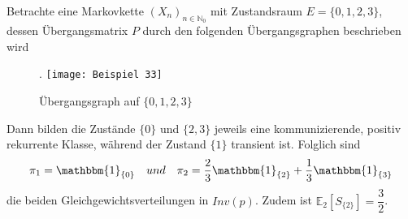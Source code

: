 Betrachte eine Markovkette $(X_{n})_{n \in \mathbb{N}_{0}}$ mit Zustandsraum $E = \lbrace 0,1,2,3 \rbrace$, dessen Übergangsmatrix $P$ durch den folgenden Übergangsgraphen beschrieben wird
\begin{figure}[H].
\centering
\texttt{[image: Beispiel 33]}
\caption{Übergangsgraph auf $\lbrace 0,1,2,3 \rbrace$}
\end{figure}
\noindent
Dann bilden die Zustände $\lbrace 0 \rbrace$ und $\lbrace 2,3 \rbrace$ jeweils eine kommunizierende, positiv rekurrente Klasse, während der Zustand $\lbrace 1 \rbrace$ transient ist. Folglich sind
\begin{equation*}
\pi_{1} = \mathbbm{1}_{\lbrace 0 \rbrace} \quad und \quad \pi_{2} = \dfrac{2}{3}\mathbbm{1}_{\lbrace 2 \rbrace} + \dfrac{1}{3}\mathbbm{1}_{\lbrace 3 \rbrace}
\end{equation*}
die beiden Gleichgewichtsverteilungen in $Inv(p)$. Zudem ist $\mathbb{E}_{2}[S_{\lbrace 2 \rbrace}] = \dfrac{3}{2}$.